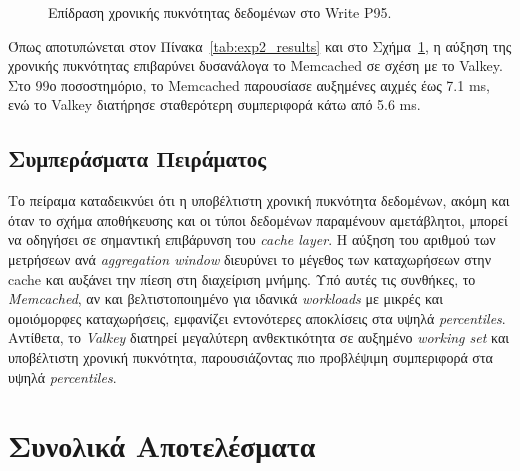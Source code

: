 \begin{figure}[htbp]
	\centering
	\caption{Επίδραση χρονικής πυκνότητας δεδομένων στο Write P95.}
	\label{fig:exp2_density}
\end{figure}

Όπως αποτυπώνεται στον Πίνακα~\ref{tab:exp2_results}
και
στο
Σχήμα~\ref{fig:exp2_density},
η αύξηση της χρονικής πυκνότητας επιβαρύνει δυσανάλογα το Memcached σε σχέση με
το Valkey. Στο 99ο ποσοστημόριο, το Memcached παρουσίασε αυξημένες αιχμές έως
7.1 ms, ενώ το Valkey διατήρησε σταθερότερη συμπεριφορά κάτω από 5.6 ms.

\subsection{Συμπεράσματα Πειράματος}

Το πείραμα καταδεικνύει ότι η υποβέλτιστη χρονική πυκνότητα δεδομένων, ακόμη
και όταν το σχήμα αποθήκευσης και οι τύποι δεδομένων παραμένουν αμετάβλητοι,
μπορεί να οδηγήσει σε σημαντική επιβάρυνση του \textit{cache layer}. Η αύξηση
του αριθμού των μετρήσεων ανά \textit{aggregation window} διευρύνει το μέγεθος
των καταχωρήσεων στην cache και αυξάνει την πίεση στη διαχείριση μνήμης. Υπό
αυτές τις συνθήκες, το \textit{Memcached}, αν και βελτιστοποιημένο για ιδανικά
\textit{workloads} με μικρές και ομοιόμορφες καταχωρήσεις, εμφανίζει
εντονότερες αποκλίσεις στα υψηλά \textit{percentiles}. Αντίθετα, το
\textit{Valkey} διατηρεί μεγαλύτερη ανθεκτικότητα σε αυξημένο \textit{working
	set} και υποβέλτιστη χρονική πυκνότητα, παρουσιάζοντας πιο προβλέψιμη
συμπεριφορά στα υψηλά \textit{percentiles}.

\section{Συνολικά Αποτελέσματα}

